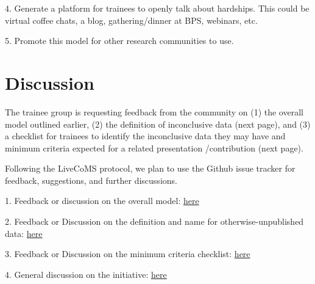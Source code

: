 \documentclass[9pt,lessons]{livecoms}
\theoremstyle{definition}
\theoremstyle{remark}
\begin{document}
4. Generate a platform for trainees to openly talk about hardships. This could be virtual coffee chats, a blog, gathering/dinner at BPS, webinars, etc.  

5. Promote this model for other research communities to use.


\section{Discussion}

The trainee group is requesting feedback from the community on (1) the overall model outlined earlier, (2) the definition of inconclusive data (next page), and (3) a checklist for trainees to 
identify the inconclusive data they may have and minimum criteria expected for a related presentation /contribution (next page).

Following the LiveCoMS protocol, we plan to use the Github issue tracker for feedback, suggestions, and further discussions.

1. Feedback or discussion on the overall model: \href{https://github.com/Poruthoor/LearningCurveInitiative/issues/2}{here}

2. Feedback or Discussion on the definition and name for otherwise-unpublished data: \href{https://github.com/Poruthoor/LearningCurveInitiative/issues/3}{here} 

3. Feedback or Discussion on the minimum criteria checklist: \href{https://github.com/Poruthoor/LearningCurveInitiative/issues/4}{here} 

4. General discussion on the initiative: \href{https://github.com/Poruthoor/LearningCurveInitiative/discussions/6}{here} 
\end{document}
